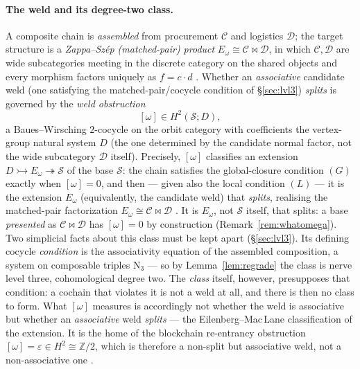 \documentclass[11pt]{article}
\theoremstyle{definition}
\newcommand{\Z}{\mathbb{Z}}
\newcommand{\sS}{\mathcal{S}}
\newcommand{\cC}{\mathcal{C}}
\newcommand{\cD}{\mathcal{D}}
\newcommand{\Nerve}{\mathrm{N}}
\begin{document}
\paragraph{The weld and its degree-two class.}
A composite chain is \emph{assembled} from procurement $\cC$ and logistics $\cD$; the target
structure is a \emph{Zappa--Sz\'ep (matched-pair) product} $E_\omega\cong\cC\bowtie\cD$, in which $\cC,\cD$ are
wide subcategories meeting in the discrete category on the shared objects and every morphism factors
uniquely as $f=c\cdot d$ \cite{AhmanUustalu2016,MacBethZS}. Whether an \emph{associative} candidate
weld (one satisfying the matched-pair/cocycle condition of \S\ref{sec:lvl3}) \emph{splits} is governed
by the \emph{weld obstruction}
\[
   [\omega]\in H^2(\sS;D),
\]
a Baues--Wirsching $2$-cocycle on the orbit category with coefficients the vertex-group natural
system $D$ (the one determined by the candidate normal factor, not the wide subcategory $\cD$
itself). Precisely, $[\omega]$ classifies an extension $D\rightarrowtail E_\omega\twoheadrightarrow\sS$
of the base $\sS$: the chain satisfies the global-closure condition $(G)$ exactly when $[\omega]=0$,
and then --- given also the local condition $(L)$ --- it is the extension $E_\omega$ (equivalently, the
candidate weld) that \emph{splits}, realising the matched-pair factorization $E_\omega\cong\cC\bowtie\cD$
\cite{MacBethZS}. It is $E_\omega$, not $\sS$ itself, that splits: a base \emph{presented} as
$\cC\bowtie\cD$ has $[\omega]=0$ by construction (Remark~\ref{rem:whatomega}). Two simplicial
facts about this class must be kept apart (\S\ref{sec:lvl3}). Its defining cocycle \emph{condition} is
the associativity equation of the assembled composition, a system on composable triples $\Nerve_3$ ---
so by Lemma~\ref{lem:regrade} the class is nerve level three, cohomological degree two. The
\emph{class} itself, however, presupposes that condition: a cochain that violates it is not a weld at
all, and there is then no class to form. What $[\omega]$ measures is accordingly not whether the weld
is associative but whether an \emph{associative} weld \emph{splits} --- the Eilenberg--Mac\,Lane
classification of the extension. It is the home of the blockchain re-entrancy obstruction
$[\omega]=\varepsilon\in H^2\cong\Z/2$, which is therefore a non-split but associative weld, not a
non-associative one \cite{MacBethReentrancy}.
\end{document}
